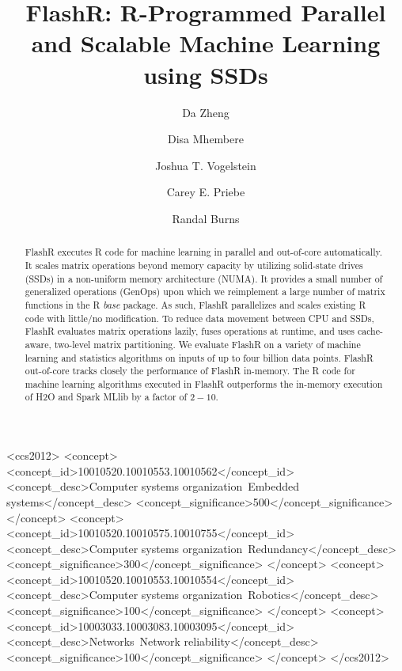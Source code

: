 \documentclass[sigconf]{acmart}
\begin{document}
\title{FlashR: R-Programmed Parallel and Scalable Machine Learning using SSDs}

\author{Da Zheng}

\author{Disa Mhembere}

\author{Joshua T. Vogelstein}

\author{Carey E. Priebe}

\author{Randal Burns}

\begin{abstract}
FlashR executes R code for machine learning
in parallel and out-of-core automatically. It scales matrix operations
beyond memory capacity by utilizing solid-state drives (SSDs) in a non-uniform
memory architecture (NUMA). It provides a small number of generalized 
operations (GenOps) upon which we reimplement a large number of
matrix functions in the R \textit{base} package. As such, FlashR parallelizes
and scales existing R code with little/no modification. To reduce data movement
between CPU and SSDs, FlashR evaluates matrix operations lazily, fuses
operations at runtime, and uses cache-aware, two-level matrix partitioning.
We evaluate FlashR on a variety of machine learning and statistics algorithms 
on inputs of up to four billion data points.
FlashR out-of-core tracks closely the performance of FlashR in-memory.
The R code for machine learning algorithms executed in FlashR
outperforms the in-memory execution of H2O and Spark MLlib by a factor of $2-10$.
\end{abstract}

%
%
\begin{CCSXML}
<ccs2012>
 <concept>
  <concept_id>10010520.10010553.10010562</concept_id>
  <concept_desc>Computer systems organization~Embedded systems</concept_desc>
  <concept_significance>500</concept_significance>
 </concept>
 <concept>
  <concept_id>10010520.10010575.10010755</concept_id>
  <concept_desc>Computer systems organization~Redundancy</concept_desc>
  <concept_significance>300</concept_significance>
 </concept>
 <concept>
  <concept_id>10010520.10010553.10010554</concept_id>
  <concept_desc>Computer systems organization~Robotics</concept_desc>
  <concept_significance>100</concept_significance>
 </concept>
 <concept>
  <concept_id>10003033.10003083.10003095</concept_id>
  <concept_desc>Networks~Network reliability</concept_desc>
  <concept_significance>100</concept_significance>
 </concept>
</ccs2012>  
\end{CCSXML}
\end{document}
